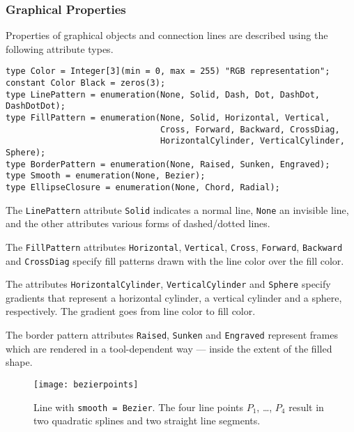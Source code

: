 \subsubsection{Graphical Properties}\label{graphical-properties}

Properties of graphical objects and connection lines are described using the following attribute types.
\begin{lstlisting}[language=modelica]
type Color = Integer[3](min = 0, max = 255) "RGB representation";
constant Color Black = zeros(3);
type LinePattern = enumeration(None, Solid, Dash, Dot, DashDot, DashDotDot);
type FillPattern = enumeration(None, Solid, Horizontal, Vertical,
                               Cross, Forward, Backward, CrossDiag,
                               HorizontalCylinder, VerticalCylinder, Sphere);
type BorderPattern = enumeration(None, Raised, Sunken, Engraved);
type Smooth = enumeration(None, Bezier);
type EllipseClosure = enumeration(None, Chord, Radial);
\end{lstlisting}%
The \lstinline!LinePattern! attribute \lstinline!Solid! indicates a normal line, \lstinline!None! an invisible line, and the other attributes various forms of dashed/dotted lines.

The \lstinline!FillPattern! attributes \lstinline!Horizontal!, \lstinline!Vertical!, \lstinline!Cross!, \lstinline!Forward!, \lstinline!Backward! and \lstinline!CrossDiag! specify fill patterns drawn with the line color over the fill color.

The attributes \lstinline!HorizontalCylinder!, \lstinline!VerticalCylinder! and \lstinline!Sphere! specify gradients that represent a horizontal cylinder, a vertical cylinder and a sphere, respectively.
The gradient goes from line color to fill color.

The border pattern attributes \lstinline!Raised!, \lstinline!Sunken! and \lstinline!Engraved! represent frames which are rendered in a tool-dependent way --- inside the extent of the filled shape.

\begin{figure}[H]
  \begin{center}
    \texttt{[image: bezierpoints]}
  \end{center}
  \caption{%
    Line with \lstinline!smooth = Bezier!.
    The four line points $P_{1}$, \ldots{}, $P_{4}$ result in two quadratic splines and two straight line segments.
  }\label{fig:smooth-bezier}
\end{figure}

